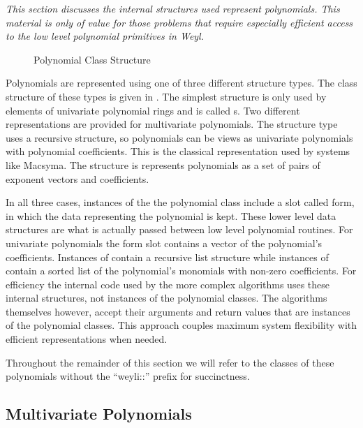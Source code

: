 {\em This section discusses the internal structures used represent
polynomials. This material is only of value for those problems that
require especially efficient access to the low level polynomial
primitives in Weyl. }

\begin{figure}
\begin{center}
\end{center}
\caption{Polynomial Class Structure\label{PolyElt:Fig}}
\end{figure}

Polynomials are represented using one of three different
structure types. The class structure of these types is given in
.  The simplest structure is only used by elements of
univariate polynomial rings and is called s.
Two different representations are provided for multivariate
polynomials.  The  structure type uses a
recursive structure, so polynomials can be views as univariate
polynomials with polynomial coefficients.  This is the classical
representation used by systems like Macsyma.  The
 structure is represents polynomials as a
set of pairs of exponent vectors and coefficients.

In all three cases, instances of the the polynomial class include a
slot called form, in which the data representing the polynomial is
kept. These lower level data structures are what is actually passed
between low level polynomial routines. For univariate polynomials the
form slot contains a vector of the polynomial's coefficients.
Instances of  contain a recursive list
structure while instances of  contain a
sorted list of the polynomial's monomials with non-zero
coefficients. For efficiency the internal code used by the more
complex algorithms uses these internal structures, not instances of
the polynomial classes. The algorithms themselves however, accept
their arguments and return values that are instances of the polynomial
classes. This approach couples maximum system flexibility with
efficient representations when needed.
  
Throughout the remainder of this section we will refer to the classes
of these polynomials without the ``{\sf weyli::}'' prefix for succinctness.

\subsection{Multivariate Polynomials}
\label{MultPoly:Rep:Sec}


